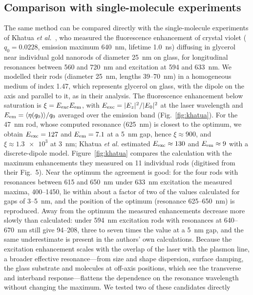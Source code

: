 \documentclass[11pt,a4paper]{article}
\begin{document}
\subsection{Comparison with single-molecule experiments}
The same method can be compared directly with the single-molecule experiments of Khatua \emph{et al.}~\cite{khatua},
who measured the fluorescence enhancement of crystal violet ($q_0=0.0228$, emission maximum \SI{640}{nm}, lifetime
\SI{1.0}{ns}) diffusing in glycerol near individual gold nanorods of diameter \SI{25}{nm} on glass, for longitudinal
resonances between 560 and \SI{720}{nm} and excitation at 594 and \SI{633}{nm}. We modelled their rods (diameter
\SI{25}{nm}, lengths 39--\SI{70}{nm}) in a homogeneous medium of index 1.47, which represents glycerol on glass, with
the dipole on the axis and parallel to it, as in their analysis. The fluorescence enhancement below saturation is
$\xi=E_{\rm exc}E_{\rm em}$, with $E_{\rm exc}=|E_z|^2/|E_0|^2$ at the laser wavelength and
$E_{\rm em}=\langle\eta(q_0)\rangle/q_0$ averaged over the emission band (Fig.~\ref{fig:khatua}). For the
\SI{47}{nm} rod, whose computed resonance (\SI{625}{nm}) is closest to the optimum, we obtain $E_{\rm exc}=127$ and
$E_{\rm em}=7.1$ at a \SI{5}{nm} gap, hence $\xi\approx900$, and $\xi\approx\num{1.3e3}$ at \SI{3}{nm}; Khatua
\emph{et al.} estimated $E_{\rm exc}\approx130$ and $E_{\rm em}\approx9$ with a discrete-dipole model. Figure~\ref{fig:khatua}
compares the calculation with the maximum enhancements they measured on 11 individual rods (digitised from their
Fig.~5). Near the optimum the agreement is good: for the four rods with resonances between 615 and \SI{650}{nm} under
\SI{633}{nm} excitation the measured maxima, 400--\num{1450}, lie within about a factor of two of the values calculated for
gaps of 3--\SI{5}{nm}, and the position of the optimum (resonance 625--\SI{650}{nm}) is reproduced. Away from the
optimum the measured enhancements decrease more slowly than calculated: under \SI{594}{nm} excitation rods with
resonances at 640--\SI{670}{nm} still give 94--208, three to seven times the value at a \SI{5}{nm} gap, and the same
underestimate is present in the authors' own calculations. Because the excitation enhancement scales with the overlap
of the laser with the plasmon line, a broader effective resonance---from size and shape dispersion, surface damping,
the glass substrate and molecules at off-axis positions, which see the transverse and interband response---flattens the
dependence on the resonance wavelength without changing the maximum. We tested two of these candidates directly
\end{document}
